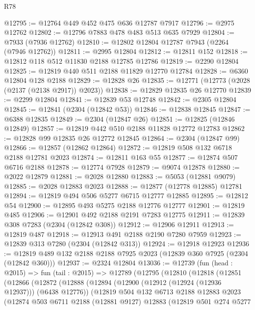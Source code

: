 \begin{lexlean}{R78}
\begin{coremodule}
@12795 := @12764 @449 @452 @475 @636 @12787 @7917
@12796 := @2975 @12762
@12802 := @12796 @7883 @478 @483 @513 @635 @7929
@12804 := @7933 (@7936 @12762)
@12810 := @12802 @12804 @12787 @7943 (@2264 (@7946 @12762))
@12811 := @2995 @12804
@12812 := @12811 @152
@12818 := @12812 @118 @512 @11830 @2188 @12785 @12786
@12819 := @2290 @12804
@12825 := @12819 @440 @511 @2188 @11829 @12770 @12784
@12828 := @6360 @12804 @128 @2188
@12829 := @12828 @26
@12835 := @12771 (@12773 (@2028 (@2137 (@2138 @2917)) @2023))
@12838 := @12829 @12835 @26 @12770
@12839 := @2299 @12804
@12841 := @12839 @53 @12748
@12842 := @2305 @12804
@12845 := @12841 (@2304 (@12842 @53))
@12846 := @12838 @12845
@12847 := @6388 @12835
@12849 := @2304 (@12847 @26)
@12851 := @12825 (@12846 @12849)
@12857 := @12819 @442 @510 @2188 @11828 @12772 @12783
@12862 := @12828 @99 @12835 @26 @12772 @12845
@12864 := @2304 (@12847 @99)
@12866 := @12857 (@12862 @12864)
@12872 := @12819 @508 @132 @6718 @2188 @12781 @2023
@12874 := @12811 @163 @55
@12877 := @12874 @507 @6716 @2188
@12878 := @12774 @7928
@12879 := @9074 @12878
@12880 := @2022 @12879
@12881 := @2028 @12880
@12883 := @5053 (@12881 @9079)
@12885 := @2028 @12883 @2023
@12888 := @12877 (@12778 @12885) @12781
@12894 := @12819 @494 @506 @5277 @6715 @12777 @12885
@12895 := @12812 @54
@12900 := @12895 @493 @5275 @2188 @12776 @12777
@12901 := @12819 @485
@12906 := @12901 @492 @2188 @2191 @7283 @12775
@12911 := @12839 @308 @7283 (@2304 (@12842 @308))
@12912 := @12906 @12911
@12913 := @12819 @487
@12918 := @12913 @491 @2188 @2190 @7280 @7959
@12923 := @12839 @313 @7280 (@2304 (@12842 @313))
@12924 := @12918 @12923
@12936 := @12819 @489 @132 @2188 @2188 @7925 @2023 (@12839 @360 @7925 (@2304 (@12842 @360)))
@12937 := @2324 @12804
@13036 := @12739
    (fun (head : @2015) =>
    fun (tail : @2015) =>
    @12789
      (@12795
        (@12810
          (@12818
            (@12851
              (@12866
                (@12872
                  (@12888
                    (@12894
                      (@12900 (@12912 (@12924 (@12936 @12937))) (@6438 @12776))
                      (@12819
                        @504
                        @132
                        @6713
                        @2188
                        @12883
                        @2023
                        (@12874
                          @503
                          @6711
                          @2188
                          (@12881 @9127)
                          @12883
                          (@12819
                            @501
                            @274
                            @5277

\end{coremodule}
\end{lexlean}
